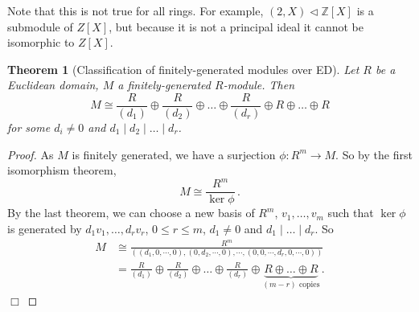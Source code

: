 \documentclass{article}
\theoremstyle{plain}\theoremheaderfont{\normalfont\itshape}\theorembodyfont{\rmfamily}\theoremseparator{.}\newtheorem*{rem}{Remark}\newtheorem*{ex}{Example}\newtheorem*{proof}{Proof}\newtheorem*{altp}{Alternative proof}\newtheorem*{nonex}{Non-Example}
\theoremstyle{plain}\theoremheaderfont{\normalfont\bfseries}\theorembodyfont{\rmfamily}\theoremseparator{.}\newtheorem{thm}{Theorem}[section]\newtheorem{lem}[thm]{Lemma}\newtheorem{prop}[thm]{Proposition}\newtheorem*{cor}{Corollary}\newtheorem{defn}[thm]{Definition}\newtheorem{clm}[thm]{Claim}\newtheorem{clminproof}{Claim}\newtheorem*{notn}{Notation}\newtheorem*{exer}{Exercise}\newtheorem*{lemnn}{Lemma}
\theoremstyle{break}\theoremheaderfont{\normalfont\itshape}\theorembodyfont{\rmfamily}\theoremseparator{.\medskip}\newtheorem*{proofskip}{Proof}\newtheorem*{exs}{Examples}\newtheorem*{rems}{Remarks}\newtheorem*{obs}{Observations}
\theoremstyle{break}\theoremheaderfont{\normalfont\bfseries}\theorembodyfont{\rmfamily}\theoremseparator{.\medskip}\newtheorem{lemskip}[thm]{Lemma}\newtheorem{defnskip}[thm]{Definition}\newtheorem{propskip}[thm]{Proposition}\newtheorem{thmskip}[thm]{Theorem}
\numberwithin{equation}{section}
\newcommand{\qed}{\hfill\ensuremath{\Box}}
\newcommand{\ZZ}{\mathbb{Z}}
\begin{document}
    Note that this is not true for all rings. For example, \((2,X)\lhd\ZZ[X]\) is a submodule of \(Z[X]\), but because it is not a principal ideal it cannot be isomorphic to \(Z[X]\).
    \begin{thm}[Classification of finitely-generated modules over ED]
        Let \(R\) be a Euclidean domain, \(M\) a finitely-generated \(R\)-module. Then
        \[M\cong\frac{R}{(d_1)}\oplus\frac{R}{(d_2)}\oplus\dots\oplus\frac{R}{(d_r)}\oplus R\oplus\dots\oplus R\]
        for some \(d_i\ne 0\) and \(d_1\mid d_2\mid\dots\mid d_r\).
    \end{thm}
    \begin{proof}
        As \(M\) is finitely generated, we have a surjection \(\phi:R^m\to M\). So by the first isomorphism theorem,
        \[M\cong\frac{R^m}{\ker\phi}\,.\]
        By the last theorem, we can choose a new basis of \(R^m\), \(v_1,\dots,v_m\) such that \(\ker\phi\) is generated by \(d_1v_1,\dots,d_rv_r\), \(0\le r\le m\), \(d_1\ne 0\) and \(d_1\mid\dots\mid d_r\). So
        \begin{align*}
            M&\cong\frac{R^m}{((d_1,0,\cdots,0),(0,d_2,\cdots,0),\cdots,(0,0,\cdots,d_r,0,\cdots,0))}\\
            &=\frac{R}{(d_1)}\oplus\frac{R}{(d_2)}\oplus\dots\oplus\frac{R}{(d_r)}\oplus \underbrace{R\oplus\dots\oplus R}_{(m-r)\text{ copies}}\,.
        \end{align*}\qed
    \end{proof}
\end{document}
